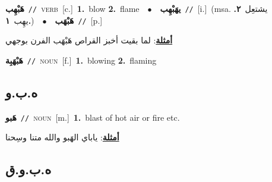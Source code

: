 \documentclass[10pt,a4paper,twoside]{article} %
\begin{document}
\begin{multicols}{2}
{{{{{{{{\setlength\topsep{0pt}\textbf{\foreignlanguage{arabic}{هَبْهِب}}\ {\color{gray}\texttt{//}\color{black}}\ \textsc{verb}\ [c.]\ \textbf{1.}~blow  \textbf{2.}~flame\ \ $\bullet$\ \ \setlength\topsep{0pt}\textbf{\foreignlanguage{arabic}{يهَبْهِب}}\ {\color{gray}\texttt{//}\color{black}}\ [i.]\ \color{gray}(msa. \foreignlanguage{arabic}{يشتعِل}~\foreignlanguage{arabic}{\textbf{٢.}}  \foreignlanguage{arabic}{يهِب}~\foreignlanguage{arabic}{\textbf{١.}})\color{black}\ \ $\bullet$\ \ \setlength\topsep{0pt}\textbf{\foreignlanguage{arabic}{هَبْهَب}}\ {\color{gray}\texttt{//}\color{black}}\ [p.]\  \begin{flushright}\color{gray}\foreignlanguage{arabic}{\textbf{\underline{\foreignlanguage{arabic}{أمثلة}}}: لما بقيت أخبز القراص هَبْهَب الفرن بوجهي}\end{flushright}\color{black}} \vspace{2mm}

{\setlength\topsep{0pt}\textbf{\foreignlanguage{arabic}{هَبْهَبِة}}\ {\color{gray}\texttt{//}\color{black}}\ \textsc{noun}\ [f.]\ \textbf{1.}~blowing  \textbf{2.}~flaming\ 

\vspace{-3mm}
\subsection*{\color{blue}\foreignlanguage{arabic}{ه.ب.و}\color{blue}{}} 

{\setlength\topsep{0pt}\textbf{\foreignlanguage{arabic}{هَبو}}\ {\color{gray}\texttt{//}\color{black}}\ \textsc{noun}\ [m.]\ \textbf{1.}~blast of hot air or fire etc.\  \begin{flushright}\color{gray}\foreignlanguage{arabic}{\textbf{\underline{\foreignlanguage{arabic}{أمثلة}}}: ياباي الهَبو والله متنا وسِحنا}\end{flushright}\color{black}} \vspace{2mm}

\vspace{-3mm}
\subsection*{\color{blue}\foreignlanguage{arabic}{ه.ب.و.ق}\color{blue}{}} 

}}}}}}}}
\end{multicols}
\end{document}
